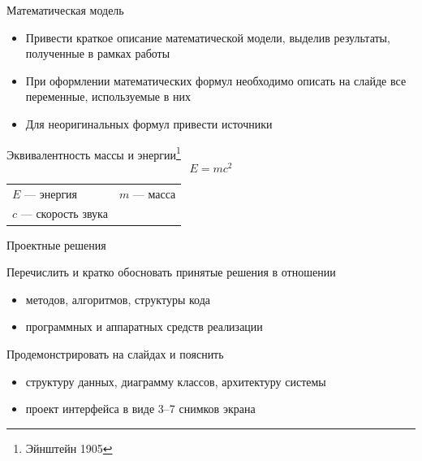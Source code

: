 \documentclass{../cls/fefu_presentation}
\begin{document}
    \begin{frame}{Математическая модель}
        \begin{block}{}
            \begin{itemize}
                \item Привести краткое описание математической модели, выделив результаты, полученные в рамках работы
                \item При оформлении математических формул необходимо описать на слайде все переменные, используемые в них
                \item Для неоригинальных формул привести источники
            \end{itemize}
        \end{block}
        \begin{block}{Эквивалентность массы и энергии\footnote{Эйнштейн 1905}}
            \begin{equation}
                E=mc^2
            \end{equation}

            \centering
            \begin{tabular}{ll}
                $E$ --- энергия & $m$ --- масса\\
                $c$ --- скорость звука&\\
            \end{tabular}
        \end{block}
    \end{frame}

    \note{}

    \begin{frame}{Проектные решения}
        \begin{block}{}
            Перечислить и кратко обосновать принятые решения в отношении
            \begin{itemize}
                \item методов, алгоритмов, структуры кода
                \item программных и аппаратных средств реализации
            \end{itemize}
        \end{block}
        \begin{block}{}
            Продемонстрировать на слайдах и пояснить
            \begin{itemize}
                \item структуру данных, диаграмму классов, архитектуру системы
                \item проект интерфейса в виде 3--7 снимков экрана
            \end{itemize}
        \end{block}
    \end{frame}
\end{document}
